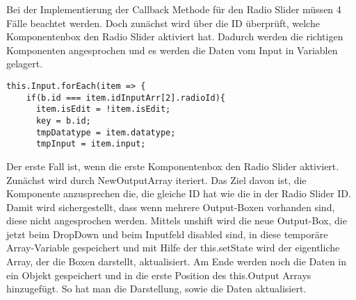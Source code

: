\documentclass[a4paper,11pt]{scrreprt}
\begin{document}
Bei der Implementierung der Callback Methode für den Radio Slider müssen 4 Fälle beachtet werden. Doch zunächst wird über die ID überprüft, welche Komponentenbox den Radio Slider aktiviert hat. Dadurch werden die richtigen Komponenten angesprochen und es werden die Daten vom Input in Variablen gelagert. 
\begin{lstlisting}
this.Input.forEach(item => {
    if(b.id === item.idInputArr[2].radioId){
      item.isEdit = !item.isEdit;
      key = b.id;
      tmpDatatype = item.datatype;
      tmpInput = item.input;
\end{lstlisting}
Der erste Fall ist, wenn die erste Komponentenbox den Radio Slider aktiviert. 
Zunächst wird durch NewOutputArray iteriert. Das Ziel davon ist, die Komponente anzusprechen die, die gleiche ID hat wie die in der Radio Slider ID. Damit wird sichergestellt, dass wenn mehrere Output-Boxen vorhanden sind, diese nicht angesprochen werden. Mittels unshift wird die neue Output-Box, die jetzt beim DropDown und beim Inputfeld disabled sind, in diese temporäre Array-Variable gespeichert und mit Hilfe der this.setState wird der eigentliche Array, der die Boxen darstellt, aktualisiert. Am Ende werden noch die Daten in ein Objekt gespeichert und in die erste Position des this.Output Arrays hinzugefügt. 
So hat man die Darstellung, sowie die Daten aktualisiert.
\end{document}

